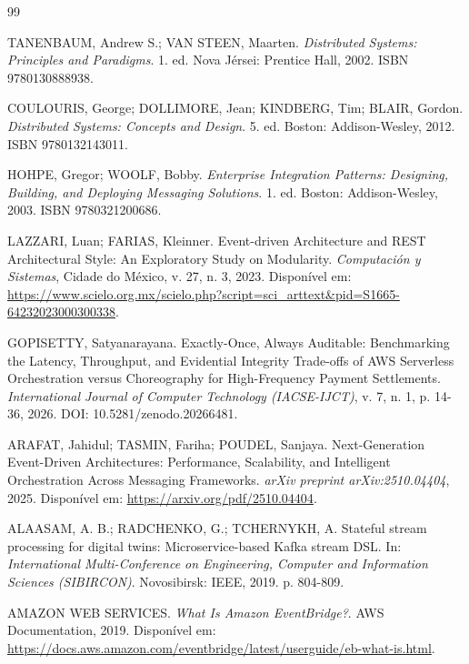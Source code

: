 \documentclass[12pt, a4paper]{article}
\begin{document}
\newpage
\renewcommand{\refname}{Referências Bibliográficas}
\begin{thebibliography}{99}

TANENBAUM, Andrew S.; VAN STEEN, Maarten. \textit{Distributed Systems: Principles and Paradigms}. 1. ed. Nova Jérsei: Prentice Hall, 2002. ISBN 9780130888938.

COULOURIS, George; DOLLIMORE, Jean; KINDBERG, Tim; BLAIR, Gordon. \textit{Distributed Systems: Concepts and Design}. 5. ed. Boston: Addison-Wesley, 2012. ISBN 9780132143011.

HOHPE, Gregor; WOOLF, Bobby. \textit{Enterprise Integration Patterns: Designing, Building, and Deploying Messaging Solutions}. 1. ed. Boston: Addison-Wesley, 2003. ISBN 9780321200686.

LAZZARI, Luan; FARIAS, Kleinner. Event-driven Architecture and REST Architectural Style: An Exploratory Study on Modularity. \textit{Computación y Sistemas}, Cidade do México, v. 27, n. 3, 2023. Disponível em: \url{https://www.scielo.org.mx/scielo.php?script=sci_arttext&pid=S1665-64232023000300338}.

GOPISETTY, Satyanarayana. Exactly-Once, Always Auditable: Benchmarking the Latency, Throughput, and Evidential Integrity Trade-offs of AWS Serverless Orchestration versus Choreography for High-Frequency Payment Settlements. \textit{International Journal of Computer Technology (IACSE-IJCT)}, v. 7, n. 1, p. 14-36, 2026. DOI: 10.5281/zenodo.20266481.

ARAFAT, Jahidul; TASMIN, Fariha; POUDEL, Sanjaya. Next-Generation Event-Driven Architectures: Performance, Scalability, and Intelligent Orchestration Across Messaging Frameworks. \textit{arXiv preprint arXiv:2510.04404}, 2025. Disponível em: \url{https://arxiv.org/pdf/2510.04404}.

ALAASAM, A. B.; RADCHENKO, G.; TCHERNYKH, A. Stateful stream processing for digital twins: Microservice-based Kafka stream DSL. In: \textit{International Multi-Conference on Engineering, Computer and Information Sciences (SIBIRCON)}. Novosibirsk: IEEE, 2019. p. 804-809.

AMAZON WEB SERVICES. \textit{What Is Amazon EventBridge?}. AWS Documentation, 2019. Disponível em: \url{https://docs.aws.amazon.com/eventbridge/latest/userguide/eb-what-is.html}.

\end{thebibliography}
\end{document}
